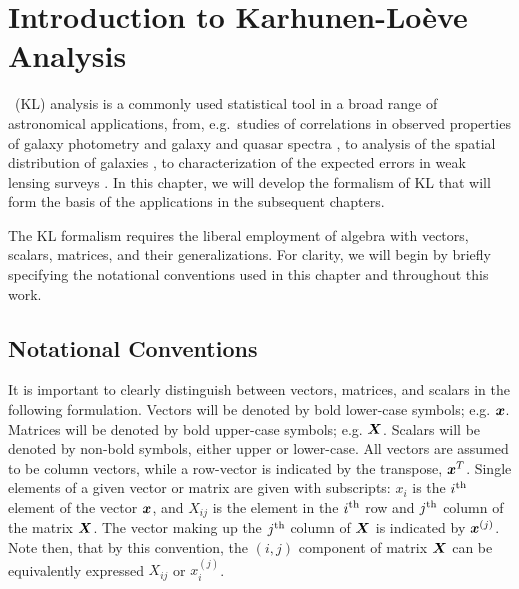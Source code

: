 \chapter{Introduction to Karhunen-Lo\`{e}ve Analysis}



\KL\ (KL) analysis is a commonly used statistical tool
in a broad range of astronomical applications, from, e.g.~studies of
correlations in observed properties of galaxy photometry \citep{Efstathiou84}
and galaxy and quasar spectra \citep{Connolly95,Connolly99,Yip04a,Yip04b},
to  analysis of the spatial distribution of galaxies 
\citep{Vogeley96, Matsubara00, Szalay03, Pope04, Tegmark06},
to characterization of the 
expected errors in weak lensing surveys \citep{Kilbinger06, Munshi06}.
In this chapter, we will develop the formalism of KL that will form
the basis of the applications in the subsequent chapters.

The KL formalism requires the liberal
employment of algebra with vectors, scalars, matrices, and their
generalizations.
For clarity, we will begin by briefly specifying the notational
conventions used in this chapter and throughout this work.

\section{Notational Conventions}

It is important to clearly distinguish between vectors, matrices, and
scalars in the following formulation.  Vectors will be denoted by
bold lower-case symbols; e.g. $\boldsymbol{x}$.  Matrices will be denoted by
bold upper-case symbols; e.g. $\boldsymbol{X}$.  Scalars will be denoted by
non-bold symbols, either upper or lower-case.
All vectors are assumed to be column vectors, while a row-vector is
indicated by the transpose, $\boldsymbol{x}^T$.  
Single elements of a given
vector or matrix are given with subscripts: $x_i$ is the $i^{\rm th}$
element of the vector $\boldsymbol{x}$, and $X_{ij}$ is the element in the
$i^{\rm th}$ row and $j^{\rm th}$ column of the matrix $\boldsymbol{X}$.
The vector making up the $j^{\rm th}$ column of $\boldsymbol{X}$ is
indicated by $\boldsymbol{x}^{(j)}$.  Note then, that by this convention,
the $(i, j)$ component of matrix $\boldsymbol{X}$ can be equivalently expressed
$X_{ij}$ or $x_i^{(j)}$.

